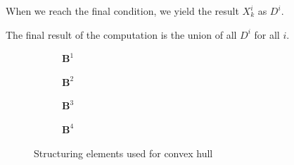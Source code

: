 \documentclass[12pt]{article}
\begin{document}
When we reach the final condition, we yield the result $X^i_k$ as $D^i$.

The final result of the computation is the union of all $D^i$ for all $i$.

\begin{figure}[H]\centering
    \begin{subfigure}[t]{.2\textwidth}\centering
        \caption{$\mathbf{B}^1$}
        \label{kernel-convex-left}
    \end{subfigure}
    \begin{subfigure}[t]{.2\textwidth}\centering
        \caption{$\mathbf{B}^2$}
        \label{kernel-convex-up}
    \end{subfigure}
    \begin{subfigure}[t]{.2\textwidth}\centering
        \caption{$\mathbf{B}^3$}
        \label{kernel-convex-right}
    \end{subfigure}
    \begin{subfigure}[t]{.2\textwidth}\centering
        \caption{$\mathbf{B}^4$}
        \label{kernel-convex-down}
    \end{subfigure}
    \caption{Structuring elements used for convex hull}
    \label{fig:convex-hull-kernels}
\end{figure}
\end{document}

